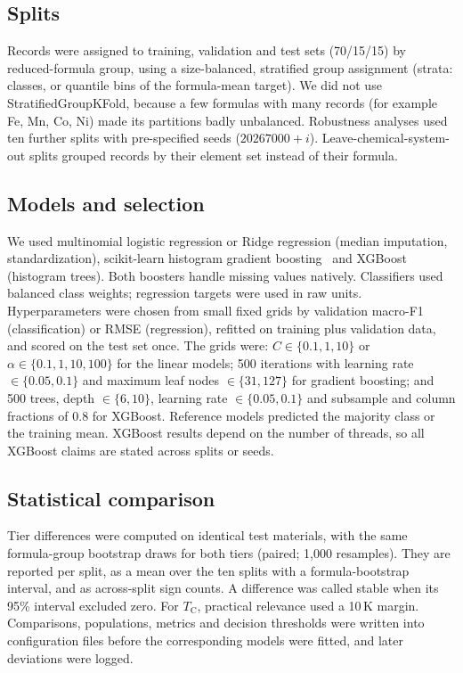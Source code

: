 \documentclass[pdflatex,sn-nature]{sn-jnl}
\newcommand{\Tc}{\ensuremath{T_\mathrm{C}}}
\begin{document}
\subsection{Splits}
Records were assigned to training, validation and test sets (70/15/15) by reduced-formula group, using a size-balanced, stratified group assignment (strata: classes, or quantile bins of the formula-mean target). We did not use StratifiedGroupKFold, because a few formulas with many records (for example Fe, Mn, Co, Ni) made its partitions badly unbalanced. Robustness analyses used ten further splits with pre-specified seeds ($20267000+i$). Leave-chemical-system-out splits grouped records by their element set instead of their formula.

\subsection{Models and selection}
We used multinomial logistic regression or Ridge regression (median imputation, standardization), scikit-learn histogram gradient boosting~\cite{pedregosa2011sklearn,ke2017lightgbm} and XGBoost~\cite{chen2016xgboost} (histogram trees). Both boosters handle missing values natively. Classifiers used balanced class weights; regression targets were used in raw units. Hyperparameters were chosen from small fixed grids by validation macro-F1 (classification) or RMSE (regression), refitted on training plus validation data, and scored on the test set once. The grids were: $C\in\{0.1,1,10\}$ or $\alpha\in\{0.1,1,10,100\}$ for the linear models; 500 iterations with learning rate $\in\{0.05,0.1\}$ and maximum leaf nodes $\in\{31,127\}$ for gradient boosting; and 500 trees, depth $\in\{6,10\}$, learning rate $\in\{0.05,0.1\}$ and subsample and column fractions of 0.8 for XGBoost. Reference models predicted the majority class or the training mean. XGBoost results depend on the number of threads, so all XGBoost claims are stated across splits or seeds.

\subsection{Statistical comparison}
Tier differences were computed on identical test materials, with the same formula-group bootstrap draws for both tiers (paired; 1,000 resamples). They are reported per split, as a mean over the ten splits with a formula-bootstrap interval, and as across-split sign counts. A difference was called stable when its 95\% interval excluded zero. For \Tc{}, practical relevance used a 10\,K margin. Comparisons, populations, metrics and decision thresholds were written into configuration files before the corresponding models were fitted, and later deviations were logged.
\end{document}
